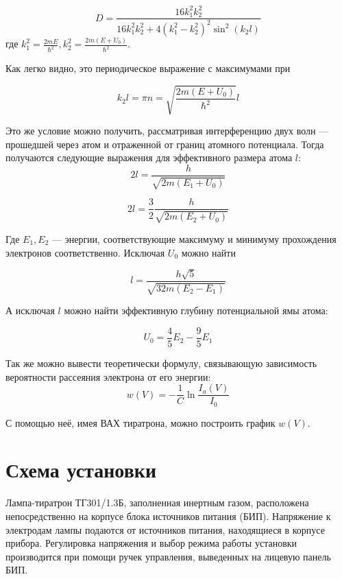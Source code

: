 \documentclass[a4paper, 12pt]{article}%
\begin{document}
\begin{equation}
D = \frac{16 k_1^2 k_2^2}{16k_1^2 k_2^2 + 4\left(k_1^2-k_2^2\right)^2\sin^2\left(k_2 l\right)}
\end{equation}
где $k_1^2 = \frac{2mE}{\hbar^2}, k_2^2 = \frac{2m(E + U_0)}{\hbar^2}$.

Как легко видно, это периодическое выражение с максимумами при 

\begin{equation}
k_2 l = \pi n = \sqrt{\frac{2m(E + U_0)}{\hbar^2}}l
\end{equation}

Это же условие можно получить, рассматривая интерференцию двух волн --- прошедшей через атом и отраженной от границ атомного потенциала. Тогда получаются следующие выражения для эффективного размера атома $l$:
\begin{equation}
2l = \frac{h}{\sqrt{2m(E_1 + U_0)}}
\end{equation}

\begin{equation}
2l = \frac{3}{2}\frac{h}{\sqrt{2m(E_2 + U_0)}}
\end{equation}

Где $E_1, E_2$ --- энергии, соответствующие максимуму и минимуму прохождения электронов соответственно. Исключая $U_0$ можно найти 

\begin{equation}
l = \frac{h\sqrt{5}}{\sqrt{32m(E_2 - E_1)}}
\end{equation}

А исключая $l$ можно найти эффективную глубину потенциальной ямы атома:

\begin{equation}
U_0 = \frac{4}{5}E_2 - \frac{9}{5}E_1
\end{equation}

Так же можно вывести теоретически формулу, связывающую зависимость вероятности рассеяния электрона от его энергии:
\begin{equation}
w(V) = -\frac{1}{C} \ln \frac{I_a(V)}{I_0}
\end{equation}

С помощью неё, имея ВАХ тиратрона, можно построить график $w(V)$.

\section*{Схема установки}
Лампа-тиратрон ТГ301/1.3Б, заполненная инертным газом, расположена непосредственно на корпусе блока источников питания (БИП). Напряжение к электродам лампы подаются от источников питания, находящиеся в корпусе прибора. Регулировка напряжения и выбор режима работы установки производится при помощи ручек управления, выведенных на лицевую панель БИП.
\end{document}
